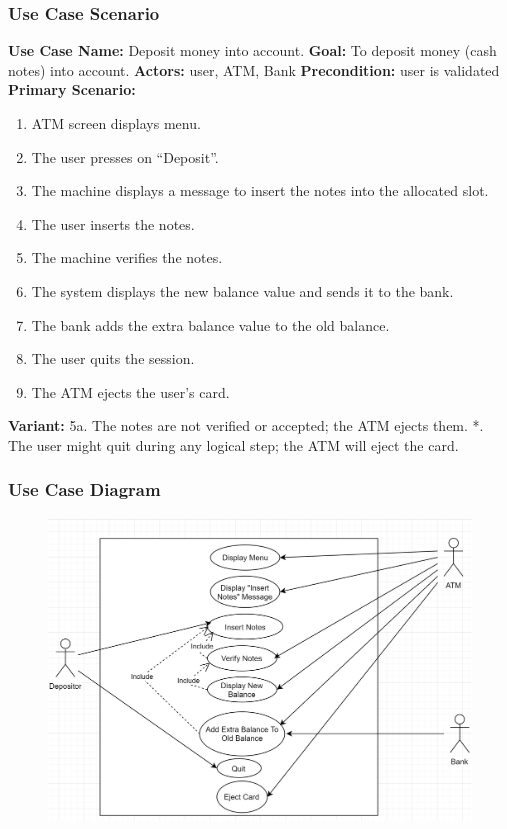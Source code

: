 \documentclass{article}
\begin{document}
	\subsubsection{Use Case Scenario}
		\textbf{Use Case Name:}	Deposit money into account.
		\newline\textbf{Goal:} To deposit money (cash notes) into account.
		\newline\textbf{Actors:} user, ATM, Bank 	
		\newline\textbf{Precondition:} user is validated 	
		\newline\textbf{Primary Scenario:}	
			\begin{enumerate}[label*=\arabic*.]
				\item ATM screen displays menu.
			    \item The user presses on “Deposit”.
			    \item The machine displays a message to insert the notes into the allocated slot.
			    \item The user inserts the notes.
			    \item The machine verifies the notes.
			    \item The system displays the new balance value and sends it to the bank.
			    \item The bank adds the extra balance value to the old balance.
			    \item The user quits the session.
			    \item The ATM ejects the user’s card.
			\end{enumerate}
		\textbf{Variant:}\newline
			\hspace*{5mm}5a. The notes are not verified or accepted; the ATM ejects them.\newline
			\hspace*{5mm}*. The user might quit during any logical step; the ATM will eject the card.

		\newpage\subsubsection{Use Case Diagram}
			\begin{figure}[h!]
			  \includegraphics[width=\linewidth]{img/deposit_usecase.png}
			\end{figure}
\end{document}
